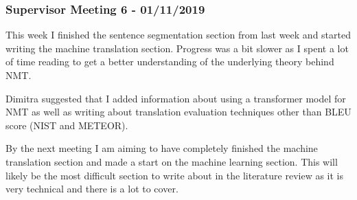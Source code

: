 \subsubsection{Supervisor Meeting 6 - 01/11/2019}
This week I finished the sentence segmentation section from last week and started writing the machine translation section. Progress was a bit slower as I spent a lot of time reading to get a better understanding of the underlying theory behind NMT.

Dimitra suggested that I added information about using a transformer model for NMT as well as writing about translation evaluation techniques other than BLEU score (NIST and METEOR).

By the next meeting I am aiming to have completely finished the machine translation section and made a start on the machine learning section. This will likely be the most difficult section to write about in the literature review as it is very technical and there is a lot to cover.
